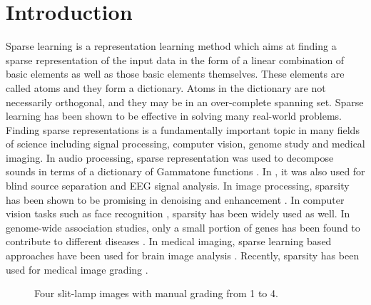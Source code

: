 \documentclass[journal]{IEEEtran}
\begin{document}
\section{Introduction}\label{introduction}
  Sparse learning is a representation learning method which aims at finding a sparse representation of the input data in the form of a linear combination of basic elements as well as those basic elements themselves. These elements are called atoms and they form a dictionary. Atoms in the dictionary are not necessarily  orthogonal, and they may be in an over-complete spanning set. 
Sparse  learning has been  shown to be effective in solving many
real-world problems.   Finding  sparse
representations  is a fundamentally important topic in many fields of
science including  signal
processing, computer vision, genome study and medical imaging. 
  In audio processing, sparse representation was used to decompose  sounds in terms of a dictionary of Gammatone functions   \cite{Adiloglu12}. In \cite{Yuanqing2004}, it was also used   for blind source separation and EEG signal analysis.  In image processing, sparsity has been shown to be promising in denoising and enhancement  \cite{BM4D, Fang13, Fang12, Elad06, Kafieh15, cheng14, chengjun16, feikou2013}.  In computer vision tasks such as face recognition \cite{Wright09, zhanglei2010,  LU2013111, Xing2013}, sparsity  has been widely used as well.  In genome-wide association studies, only a small portion of genes has been found to contribute to different diseases \cite{Golub99, zhangzhuo12, Li2015}. 
  In medical imaging, sparse learning based approaches have been used for brain  image analysis \cite{Aljabar2009MultiatlasBS, varoquaux:inria-00588898, Roy2015}. Recently, sparsity has been used  for medical image grading \cite{Xu13, CJ15}. 
  \begin{figure}
 	\caption{Four slit-lamp images with manual grading from 1 to 4.} \label{fig0}
 \end{figure}
 
\end{document}
